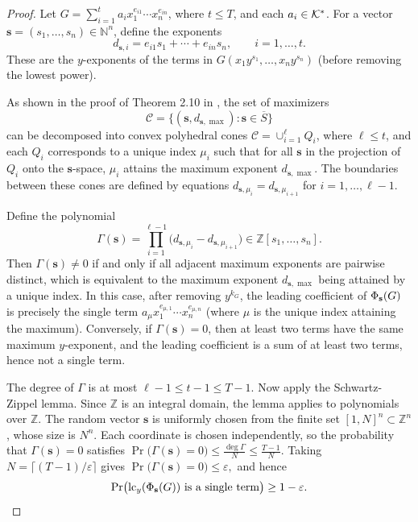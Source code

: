\documentclass{article}
\numberwithin{equation}{section}
\begin{document}
\begin{proof}
Let \(G = \sum_{i=1}^{t} a_i x_1^{e_{i1}} \cdots x_n^{e_{in}}\), where \(t \le T\), and each \(a_i \in {\mathcal{K}}^*\). For a vector \(\mathbf{s} = (s_1,\dots,s_n) \in \mathbb{N}^n\), define the exponents
\[
d_{\mathbf{s},i} = e_{i1}s_1 + \cdots + e_{in}s_n, \qquad i = 1,\dots,t.
\]
These are the \(y\)-exponents of the terms in $G(x_1 y^{s_1},\dots,x_n y^{s_n})$ (before removing the lowest power).

As shown in the proof of Theorem 2.10 in \cite{HuangGao2025}, the set of maximizers
\[
\mathcal{C} = \{ (\mathbf{s}, d_{\mathbf{s},\max}) : \mathbf{s} \in \overline{S} \}
\]
can be decomposed into convex polyhedral cones \(\mathcal{C} = \cup_{i=1}^{\ell} Q_i\), where \(\ell \le t\), and each \(Q_i\) corresponds to a unique index \(\mu_i\) such that for all \(\mathbf{s}\) in the projection of $Q_i$ onto the $\mathbf{s}$-space, $\mu_i$ attains the maximum exponent $d_{\mathbf{s},\max}$. The boundaries between these cones are defined by equations $d_{\mathbf{s},\mu_i} = d_{\mathbf{s},\mu_{i+1}}$ for $i = 1,\dots,\ell-1$.

Define the polynomial
\[
\Gamma(\mathbf{s}) = \prod_{i=1}^{\ell-1} \bigl(d_{\mathbf{s},\mu_i} - d_{\mathbf{s},\mu_{i+1}}\bigr) \in \mathbb{Z}[s_1,\dots,s_n].
\]
Then $\Gamma(\mathbf{s}) \neq 0$ if and only if all adjacent maximum exponents are pairwise distinct, which is equivalent to the maximum exponent $d_{\mathbf{s},\max}$ being attained by a unique index. In this case, after removing $y^{k_G}$, the leading coefficient of $\Phi_{\mathbf{s}}(G)$ is precisely the single term \(a_{\mu} x_1^{e_{\mu,1}}\cdots x_n^{e_{\mu,n}}\) (where $\mu$ is the unique index attaining the maximum). Conversely, if $\Gamma(\mathbf{s}) = 0$, then at least two terms have the same maximum $y$-exponent, and the leading coefficient is a sum of at least two terms, hence not a single term.

The degree of $\Gamma$ is at most $\ell-1 \le t-1 \le T-1$.
%
Now apply the Schwartz-Zippel lemma. Since $\mathbb{Z}$ is an integral domain, the lemma applies to polynomials over $\mathbb{Z}$. The random vector $\mathbf{s}$ is uniformly chosen from the finite set $[1,N]^n \subset \mathbb{Z}^n$, whose size is $N^n$. Each coordinate is chosen independently, so the probability that $\Gamma(\mathbf{s}) = 0$ satisfies
%
$\Pr\bigl(\Gamma(\mathbf{s}) = 0\bigr) \le \frac{\deg \Gamma}{N} \le \frac{T-1}{N}.$
%
Taking $N = \lceil (T-1)/\varepsilon \rceil$ gives
%
$\Pr\bigl(\Gamma(\mathbf{s}) = 0\bigr) \le \varepsilon,$
%
and hence
\[
\Pr\bigl(\operatorname{lc}_y(\Phi_{\mathbf{s}}(G))\text{ is a single term}\bigr) \ge 1 - \varepsilon.
\]
\end{proof}
\end{document}
